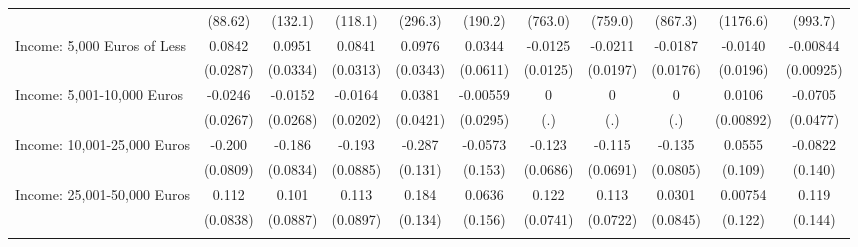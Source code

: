 {\begin{tabular}{l*{10}{c}}
            &     (88.62)         &     (132.1)         &     (118.1)         &     (296.3)         &     (190.2)         &     (763.0)         &     (759.0)         &     (867.3)         &    (1176.6)         &     (993.7)         \\
\addlinespace
Income: 5,000 Euros of Less&      0.0842\sym{**} &      0.0951\sym{**} &      0.0841\sym{**} &      0.0976\sym{**} &      0.0344         &     -0.0125         &     -0.0211         &     -0.0187         &     -0.0140         &    -0.00844         \\
            &    (0.0287)         &    (0.0334)         &    (0.0313)         &    (0.0343)         &    (0.0611)         &    (0.0125)         &    (0.0197)         &    (0.0176)         &    (0.0196)         &   (0.00925)         \\
\addlinespace
Income: 5,001-10,000 Euros&     -0.0246         &     -0.0152         &     -0.0164         &      0.0381         &    -0.00559         &           0         &           0         &           0         &      0.0106         &     -0.0705         \\
            &    (0.0267)         &    (0.0268)         &    (0.0202)         &    (0.0421)         &    (0.0295)         &         (.)         &         (.)         &         (.)         &   (0.00892)         &    (0.0477)         \\
\addlinespace
Income: 10,001-25,000 Euros&      -0.200\sym{*}  &      -0.186\sym{*}  &      -0.193\sym{*}  &      -0.287\sym{*}  &     -0.0573         &      -0.123         &      -0.115         &      -0.135         &      0.0555         &     -0.0822         \\
            &    (0.0809)         &    (0.0834)         &    (0.0885)         &     (0.131)         &     (0.153)         &    (0.0686)         &    (0.0691)         &    (0.0805)         &     (0.109)         &     (0.140)         \\
\addlinespace
Income: 25,001-50,000 Euros&       0.112         &       0.101         &       0.113         &       0.184         &      0.0636         &       0.122         &       0.113         &      0.0301         &     0.00754         &       0.119         \\
            &    (0.0838)         &    (0.0887)         &    (0.0897)         &     (0.134)         &     (0.156)         &    (0.0741)         &    (0.0722)         &    (0.0845)         &     (0.122)         &     (0.144)         \\
\addlinespace

\end{tabular}}
